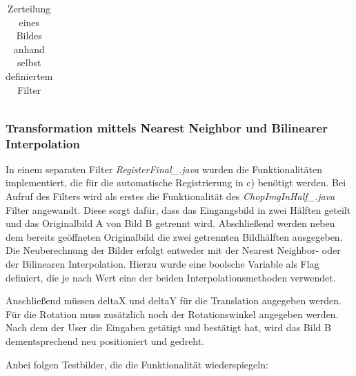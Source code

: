 \documentclass[12pt,german]{article}
\begin{document}
\begin{table}[H]
\begin{tabular}{| c | c | c |}
  \end{tabular}
  \caption{Zerteilung eines Bildes anhand selbst definiertem Filter}
  \label{tab:chopInHalfTest}
\end{table}






\subsubsection{Transformation mittels Nearest Neighbor und Bilinearer Interpolation}

In einem separaten Filter \textit{RegisterFinal\_.java} wurden die Funktionalitäten implementiert, die für die automatische Registrierung in c) benötigt werden. Bei Aufruf des Filters wird als erstes die Funktionalität des \textit{ChopImgInHalf\_.java} Filter angewandt. Diese sorgt dafür, dass das Eingangsbild in zwei Hälften geteilt und das Originalbild A von Bild B getrennt wird. Abschließend werden neben dem bereits geöffneten Originalbild die zwei getrennten Bildhälften ausgegeben. Die Neuberechnung der Bilder erfolgt entweder mit der Nearest Neighbor- oder der Bilinearen Interpolation. Hierzu wurde eine boolsche Variable als Flag definiert, die je nach Wert eine der beiden Interpolationsmethoden verwendet.

Anschließend müssen deltaX und deltaY für die Translation angegeben werden. Für die Rotation muss zusätzlich noch der Rotationswinkel angegeben werden. Nach dem der User die Eingaben  getätigt und bestätigt hat, wird das Bild B dementsprechend neu positioniert und gedreht.

Anbei folgen Testbilder, die die Funktionalität wiederspiegeln:
\end{document}

